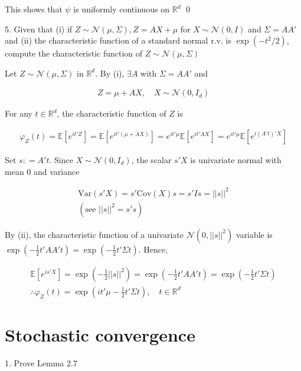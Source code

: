 \documentclass[10pt]{article}
\begin{document}
This shows that $\psi$ is uniformly continuous on $\mathbb{R}^d$ \qed

\newpage

5. Given that (i) if $Z \sim  \mathcal{N}(\mu, \Sigma), Z = AX + \mu$ for $X \sim \mathcal{N}(0, I)$ and $\Sigma = AA'$ and (ii) 
the characteristic function of a standard normal r.v. is $\exp(-t^2/2)$, compute the characteristic function of $Z \sim  \mathcal{N}(\mu, \Sigma)$

Let $Z \sim \mathcal{N}(\mu, \Sigma)$ in $\mathbb{R}^d$. By (i), $\exists A$ with $\Sigma = AA'$ and 

\begin{gather*}
    Z = \mu + AX, \quad X \sim \mathcal{N}(0, I_d)
\end{gather*}

For any $t \in \mathbb{R}^d$, the characteristic function of $Z$ is 

\begin{gather*}
    \varphi_Z(t) = \mathbb{E}[e^{it'Z}] = \mathbb{E}[e^{it'(\mu + AX)}] = e^{it'\mu}\mathbb{E}[e^{it'AX}] = e^{it'\mu}\mathbb{E}[e^{i(A't)'X}]
\end{gather*}

Set $s: = A't$. Since $X \sim \mathcal{N}(0, I_d)$, the scalar $s'X$ is univariate normal with mean 0 and variance 

\begin{gather*}
    \text{Var}(s'X) = s' \text{Cov}(X)s = s'Is = ||s||^2 \\
    (\text{see }||s||^2 = s's)
\end{gather*}

By (ii), the characteristic function of a univariate $\mathcal{N}(0, ||s||^2)$ variable is $\exp(- \frac{1}{2}t'AA't) = \exp(-\frac{1}{2}t'\Sigma t)$. Hence, 

\begin{gather*}
    \mathbb{E}[e^{is'X}] = \exp (- \frac{1}{2}||s||^2) = \exp(- \frac{1}{2}t'AA't) = \exp (- \frac{1}{2}t'\Sigma t)\\
    \therefore \varphi_Z(t) = \exp(it'\mu - \frac{1}{2}t'\Sigma t), \quad t \in \mathbb{R}^d
\end{gather*}

\newpage

\section{Stochastic convergence}

1. Prove Lemma 2.7
\end{document}
